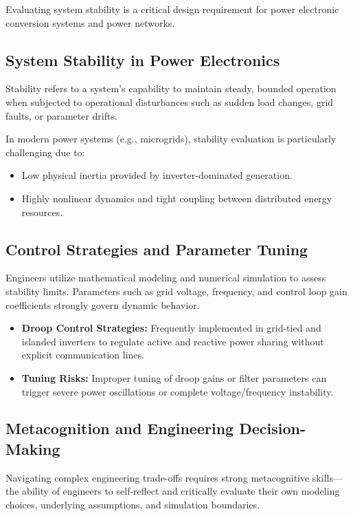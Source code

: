 \documentclass[12pt,a4paper]{article}
\begin{document}
Evaluating system stability is a critical design requirement for power electronic conversion systems and power networks.

\subsection{System Stability in Power Electronics}
Stability refers to a system's capability to maintain steady, bounded operation when subjected to operational disturbances such as sudden load changes, grid faults, or parameter drifts.

In modern power systems (e.g., microgrids), stability evaluation is particularly challenging due to:
\begin{itemize}
    \item Low physical inertia provided by inverter-dominated generation.
    \item Highly nonlinear dynamics and tight coupling between distributed energy resources.
\end{itemize}

\subsection{Control Strategies and Parameter Tuning}
Engineers utilize mathematical modeling and numerical simulation to assess stability limits. Parameters such as grid voltage, frequency, and control loop gain coefficients strongly govern dynamic behavior.

\begin{itemize}
    \item \textbf{Droop Control Strategies:} Frequently implemented in grid-tied and islanded inverters to regulate active and reactive power sharing without explicit communication lines.
    \item \textbf{Tuning Risks:} Improper tuning of droop gains or filter parameters can trigger severe power oscillations or complete voltage/frequency instability.
\end{itemize}

\subsection{Metacognition and Engineering Decision-Making}
Navigating complex engineering trade-offs requires strong metacognitive skills---the ability of engineers to self-reflect and critically evaluate their own modeling choices, underlying assumptions, and simulation boundaries.
\end{document}
